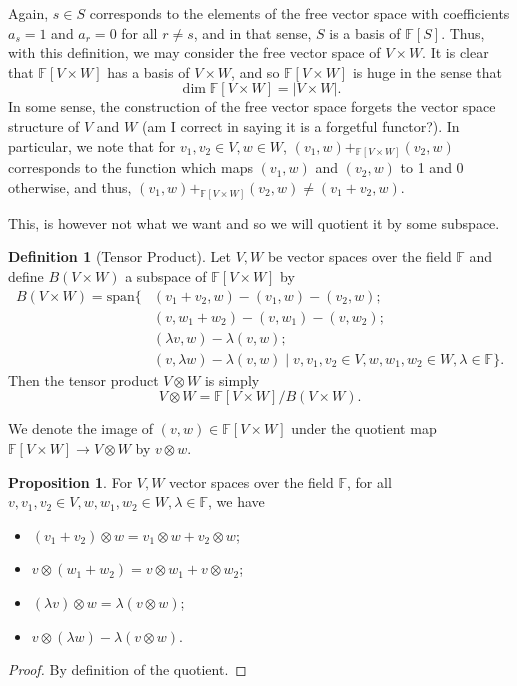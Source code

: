 \documentclass[]{article}
\theoremstyle{definition}
\theoremstyle{definition}
\newtheorem{definition}{Definition}[section]
\newtheorem{proposition}{Proposition}[section]
\begin{document}
Again, \(s \in S\) corresponds to the elements of the free vector space 
with coefficients \(a_s = 1\) and \(a_r = 0\) for all \(r \neq s\), and in that 
sense, \(S\) is a basis of \(\mathbb{F}[S]\). Thus, with this definition, 
we may consider the free vector space of \(V \times W\). It is clear that 
\(\mathbb{F}[V \times W]\) has a basis of \(V \times W\), and so 
\(\mathbb{F}[V \times W]\) is huge in the sense that
\[\dim \mathbb{F}[V \times W] = |V \times W|.\]
In some sense, the construction of the free vector space forgets the vector 
space structure of \(V\) and \(W\) (am I correct in saying it is a forgetful 
functor?). In particular, we note that for \(v_1, v_2 \in V, w \in W\), 
\((v_1, w) +_{\mathbb{F}[V \times W]} (v_2, w)\) corresponds to the function 
which maps \((v_1, w)\) and \((v_2, w)\) to 1 and 0 otherwise, and thus, 
\((v_1, w) +_{\mathbb{F}[V \times W]} (v_2, w) \neq (v_1 + v_2, w)\). 

This, is however not what we want and so we will quotient it by some subspace.

\begin{definition}[Tensor Product]
  Let \(V, W\) be vector spaces over the field \(\mathbb{F}\) and define 
  \(B(V \times W)\) a subspace of \(\mathbb{F}[V \times W]\) by 
  \[\begin{split}
    B(V \times W) = \text{span}\{& (v_1 + v_2, w) - (v_1, w) - (v_2, w); \\
      & (v, w_1 + w_2) - (v, w_1) - (v, w_2); \\
      & (\lambda v, w) - \lambda(v, w); \\
      & (v, \lambda w) - \lambda(v, w) \mid 
      v, v_1, v_2 \in V, w, w_1, w_2 \in W, \lambda \in \mathbb{F}\}.
  \end{split}\]
  Then the tensor product \(V \otimes W\) is simply 
  \[V \otimes W = \mathbb{F}[V \times W] / B(V \times W).\]
\end{definition}

We denote the image of \((v, w) \in \mathbb{F}[V \times W]\) under the quotient 
map \(\mathbb{F}[V \times W] \to V \otimes W\) by \(v \otimes w\).

\begin{proposition}
  For \(V, W\) vector spaces over the field \(\mathbb{F}\),
  for all \(v, v_1, v_2 \in V, w, w_1, w_2 \in W, \lambda \in \mathbb{F}\), 
  we have 
  \begin{itemize}
    \item \((v_1 + v_2) \otimes w = v_1 \otimes w + v_2 \otimes w\); 
    \item \(v \otimes (w_1 + w_2) = v \otimes w_1 + v \otimes w_2\); 
    \item \((\lambda v) \otimes w = \lambda(v \otimes w)\); 
    \item \(v \otimes (\lambda w) - \lambda(v \otimes w)\).
  \end{itemize}
\end{proposition}
\begin{proof}
  By definition of the quotient.
\end{proof}
\end{document}
